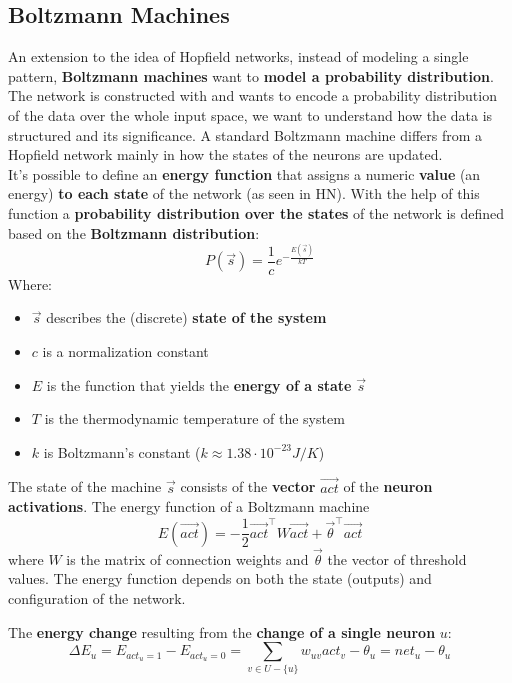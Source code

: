 
\newpage

\subsection{Boltzmann Machines}
An extension to the idea of Hopfield networks, instead of modeling a single pattern, \textbf{Boltzmann machines} want to \textbf{model a probability distribution}. The network is constructed with and wants to encode a probability distribution of the data over the whole input space, we want to understand how the data is structured and its significance. A standard Boltzmann machine differs from a Hopfield network mainly in how the states of the neurons are updated. \\

It's possible to define an \textbf{energy function} that assigns a numeric \textbf{value} (an energy) \textbf{to each state} of the network (as seen in HN). With the help of this function a \textbf{probability distribution over the states} of the network is defined based on the \textbf{Boltzmann distribution}:
$$ P(\vec{s}) = \frac{1}{c} e^{-\frac{E(\vec{s})}{kT}} $$
Where: 
\begin{itemize}
	\item $\vec{s}$ describes the (discrete) \textbf{state of the system}
	\item $c$ is a normalization constant
	\item $E$ is the function that yields the \textbf{energy of a state} $\vec{s}$
	\item $T$ is the thermodynamic temperature of the system 
	\item $k$ is Boltzmann's constant ($k \approx 1.38 \cdot 10^{-23} J/K$)
\end{itemize}

The state of the machine $\vec{s}$ consists of the \textbf{vector} $\vec{act}$ of the \textbf{neuron activations}. The energy function of a Boltzmann machine 
$$ E(\vec{act}) = - \frac{1}{2} \vec{act}^\top W \vec{act} + \vec{\theta}^\top \vec{act} $$
where $W$ is the matrix of connection weights and $\vec{\theta}$ the vector of threshold values. The energy function depends on both the state (outputs) and configuration of the network.\\

\newpage

The \textbf{energy change} resulting from the \textbf{change of a single neuron} $u$:
$$ \Delta E_u = E_{act_u = 1} - E_{act_u = 0} = \sum_{v \in U - \{u\}} w_{uv} act_v - \theta_u = net_u - \theta_u $$

